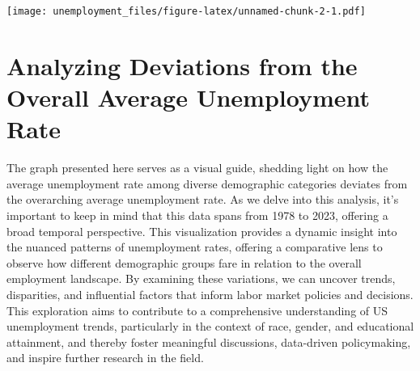 \documentclass[
]{article}
\begin{document}
\texttt{[image: unemployment\_files/figure-latex/unnamed-chunk-2-1.pdf]}

\hypertarget{analyzing-deviations-from-the-overall-average-unemployment-rate}{%
\section{Analyzing Deviations from the Overall Average Unemployment
Rate}\label{analyzing-deviations-from-the-overall-average-unemployment-rate}}

The graph presented here serves as a visual guide, shedding light on how
the average unemployment rate among diverse demographic categories
deviates from the overarching average unemployment rate. As we delve
into this analysis, it's important to keep in mind that this data spans
from 1978 to 2023, offering a broad temporal perspective. This
visualization provides a dynamic insight into the nuanced patterns of
unemployment rates, offering a comparative lens to observe how different
demographic groups fare in relation to the overall employment landscape.
By examining these variations, we can uncover trends, disparities, and
influential factors that inform labor market policies and decisions.
This exploration aims to contribute to a comprehensive understanding of
US unemployment trends, particularly in the context of race, gender, and
educational attainment, and thereby foster meaningful discussions,
data-driven policymaking, and inspire further research in the field.
\end{document}
